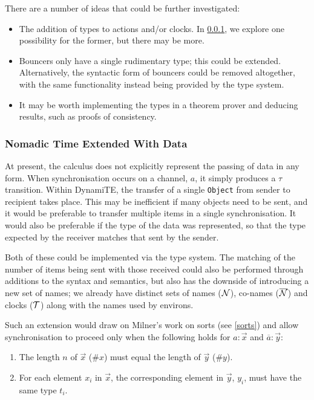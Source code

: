 There are a number of ideas that could be further investigated:

\begin{itemize}
\item The addition of types to actions and/or clocks.  In \ref{tnted},
  we explore one possibility for the former, but there may be more.
\item Bouncers only have a single rudimentary type; this could be
  extended.  Alternatively, the syntactic form of bouncers could be
  removed altogether, with the same functionality instead being
  provided by the type system.
\item It may be worth implementing the types in a theorem prover and
  deducing results, such as proofs of consistency.
\end{itemize}

\subsubsection{Nomadic Time Extended With Data}
\label{tnted}

At present, the calculus does not explicitly represent the passing of
data in any form.  When synchronisation occurs on a channel, $a$, it
simply produces a $\tau$ transition.  Within DynamiTE, the transfer of
a single \texttt{Object} from sender to recipient takes place.  This
may be inefficient if many objects need to be sent, and it would be
preferable to transfer multiple items in a single synchronisation.  It
would also be preferable if the type of the data was represented, so
that the type expected by the receiver matches that sent by the
sender.

Both of these could be implemented via the type system.  The matching
of the number of items being sent with those received could also be
performed through additions to the syntax and semantics, but also has
the downside of introducing a new set of names; we already have
distinct sets of names ($\text{$\mathcal{N}$}$), co-names ($\text{$\overline{\text{$\mathcal{N}$}}$}$) and clocks
($\text{$\mathcal{T}$}$) along with the names used by environs.

Such an extension would draw on Milner's work on sorts (see
\ref{sorts}) and allow synchronisation to proceed only when the
following holds for $a : \vec{x}$ and $\overline{a} : \vec{y}$:

\begin{enumerate}
\item The length $n$ of $\vec{x}$ ($\#x$) must equal the length of
  $\vec{y}$ ($\#y$).
\item For each element $x_i$ in $\vec{x}$, the corresponding element
  in $\vec{y}$, $y_i$, must have the same type $t_i$.
\end{enumerate}

